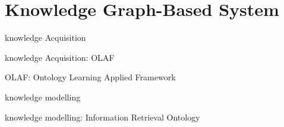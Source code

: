 \section{Knowledge Graph-Based System}

\begin{frame}{knowledge Acquisition}


\end{frame}

\begin{frame}{knowledge Acquisition: OLAF}

    OLAF: Ontology Learning Applied Framework

\end{frame}

\begin{frame}{knowledge modelling}


\end{frame}

\begin{frame}{knowledge modelling: Information Retrieval Ontology}


\end{frame}

